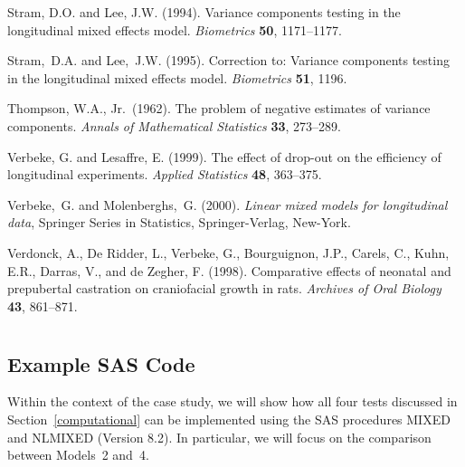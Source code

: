 \documentclass[useAMS,usenatbib,referee]{biom}
\begin{document}
\begin{thebibliography}{}
Stram, D.O. and Lee, J.W. (1994).
Variance components testing in the longitudinal mixed effects model.
{\em Biometrics} {\bfseries 50}, 1171--1177.

Stram,~D.A. and Lee,~J.W. (1995).
Correction to: Variance components testing in the longitudinal mixed
effects model.
{\em Biometrics} {\bfseries 51}, 1196.

Thompson, W.A., Jr.\ (1962).
The problem of negative estimates of variance components.
{\em Annals of Mathematical Statistics} {\bfseries 33}, 273--289.

Verbeke, G. and Lesaffre, E. (1999).
 The effect of drop-out on the efficiency of longitudinal experiments.
 {\em Applied Statistics} {\bfseries 48}, 363--375.

Verbeke,~G. and Molenberghs,~G. (2000).
{\em Linear mixed models for longitudinal data},
Springer Series in Statistics, Springer-Verlag, New-York.

{Verdonck, A., De Ridder, L., Verbeke, G., Bourguignon, J.P., Carels, C., Kuhn,
E.R., Darras, V., and de Zegher, F.}  (1998). Comparative effects of neonatal
and prepubertal castration on craniofacial growth in rats.  {\em Archives of
Oral Biology} {\bfseries 43}, 861--871.

\end{thebibliography}

\appendix


\section{}
\subsection{Example SAS Code}

Within the context of the case study, we will show how all four tests
discussed in Section~\ref{computational} can be implemented using the
SAS procedures MIXED and NLMIXED (Version 8.2). In particular, we will
focus on the comparison between Models~2 and~4.
\end{document}
